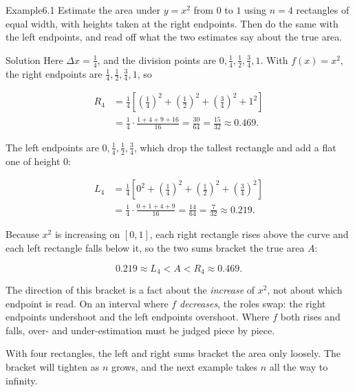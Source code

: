 \documentclass[a4paper,12pt,oneside]{memoir}
\begin{document}
\begin{workedexample}
\begin{envexample}{Example}{6.1}{}
Estimate the area under \(y = x^{2}\) from \(0\) to \(1\) using \(n = 4\) rectangles of equal width, with heights taken at the right endpoints. Then do the same with the left endpoints, and read off what the two estimates say about the true area.
\end{envexample}
\begin{envsolution}{Solution}{}{}
Here \(\Delta x = \tfrac{1}{4}\), and the division points are \(0, \tfrac14, \tfrac12, \tfrac34, 1\). With \(f(x) = x^{2}\), the right endpoints are \(\tfrac14, \tfrac12, \tfrac34, 1\), so

\[ \begin{aligned}
          R_{4} &= \tfrac{1}{4}\!\left[\left(\tfrac14\right)^{2} + \left(\tfrac12\right)^{2} + \left(\tfrac34\right)^{2} + 1^{2}\right] \\[2pt]
                &= \tfrac{1}{4}\cdot\frac{1 + 4 + 9 + 16}{16} = \frac{30}{64} = \frac{15}{32} \approx 0.469.
        \end{aligned} \]

The left endpoints are \(0, \tfrac14, \tfrac12, \tfrac34\), which drop the tallest rectangle and add a flat one of height \(0\):

\[ \begin{aligned}
          L_{4} &= \tfrac{1}{4}\!\left[0^{2} + \left(\tfrac14\right)^{2} + \left(\tfrac12\right)^{2} + \left(\tfrac34\right)^{2}\right] \\[2pt]
                &= \tfrac{1}{4}\cdot\frac{0 + 1 + 4 + 9}{16} = \frac{14}{64} = \frac{7}{32} \approx 0.219.
        \end{aligned} \]

Because \(x^{2}\) is increasing on \([0, 1]\), each right rectangle rises above the curve and each left rectangle falls below it, so the two sums bracket the true area \(A\):

\[ 0.219 \approx L_{4} < A < R_{4} \approx 0.469. \]

The direction of this bracket is a fact about the \emph{increase} of \(x^{2}\), not about which endpoint is read. On an interval where \(f\) \emph{decreases}, the roles swap: the right endpoints undershoot and the left endpoints overshoot. Where \(f\) both rises and falls, over- and under-estimation must be judged piece by piece.

With four rectangles, the left and right sums bracket the area only loosely. The bracket will tighten as \(n\) grows, and the next example takes \(n\) all the way to infinity. \qedmark
\end{envsolution}
\end{workedexample}
\end{document}
